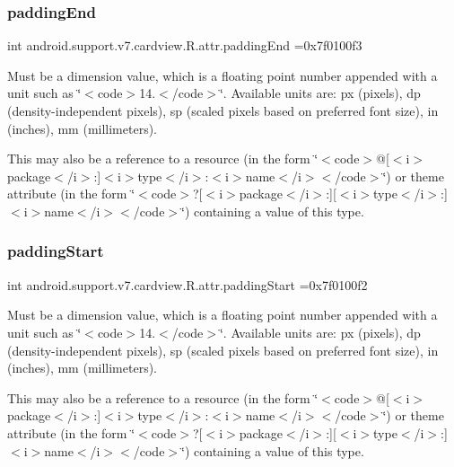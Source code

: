 \subsubsection{\texorpdfstring{padding\+End}{paddingEnd}}
{\footnotesize\ttfamily int android.\+support.\+v7.\+cardview.\+R.\+attr.\+padding\+End =0x7f0100f3\hspace{0.3cm}{\ttfamily [static]}}

Must be a dimension value, which is a floating point number appended with a unit such as \char`\"{}$<$code$>$14.\+5sp$<$/code$>$\char`\"{}. Available units are\+: px (pixels), dp (density-\/independent pixels), sp (scaled pixels based on preferred font size), in (inches), mm (millimeters). 

This may also be a reference to a resource (in the form \char`\"{}$<$code$>$@\mbox{[}$<$i$>$package$<$/i$>$\+:\mbox{]}$<$i$>$type$<$/i$>$\+:$<$i$>$name$<$/i$>$$<$/code$>$\char`\"{}) or theme attribute (in the form \char`\"{}$<$code$>$?\mbox{[}$<$i$>$package$<$/i$>$\+:\mbox{]}\mbox{[}$<$i$>$type$<$/i$>$\+:\mbox{]}$<$i$>$name$<$/i$>$$<$/code$>$\char`\"{}) containing a value of this type. \mbox{\label{classandroid_1_1support_1_1v7_1_1cardview_1_1R_1_1attr_ab0808b4220876c60ce26172cd57804f6}} 
\subsubsection{\texorpdfstring{padding\+Start}{paddingStart}}
{\footnotesize\ttfamily int android.\+support.\+v7.\+cardview.\+R.\+attr.\+padding\+Start =0x7f0100f2\hspace{0.3cm}{\ttfamily [static]}}

Must be a dimension value, which is a floating point number appended with a unit such as \char`\"{}$<$code$>$14.\+5sp$<$/code$>$\char`\"{}. Available units are\+: px (pixels), dp (density-\/independent pixels), sp (scaled pixels based on preferred font size), in (inches), mm (millimeters). 

This may also be a reference to a resource (in the form \char`\"{}$<$code$>$@\mbox{[}$<$i$>$package$<$/i$>$\+:\mbox{]}$<$i$>$type$<$/i$>$\+:$<$i$>$name$<$/i$>$$<$/code$>$\char`\"{}) or theme attribute (in the form \char`\"{}$<$code$>$?\mbox{[}$<$i$>$package$<$/i$>$\+:\mbox{]}\mbox{[}$<$i$>$type$<$/i$>$\+:\mbox{]}$<$i$>$name$<$/i$>$$<$/code$>$\char`\"{}) containing a value of this type. \mbox{\label{classandroid_1_1support_1_1v7_1_1cardview_1_1R_1_1attr_ae0382b2cfe69d6efa8813fb44fb5f1f6}} 
